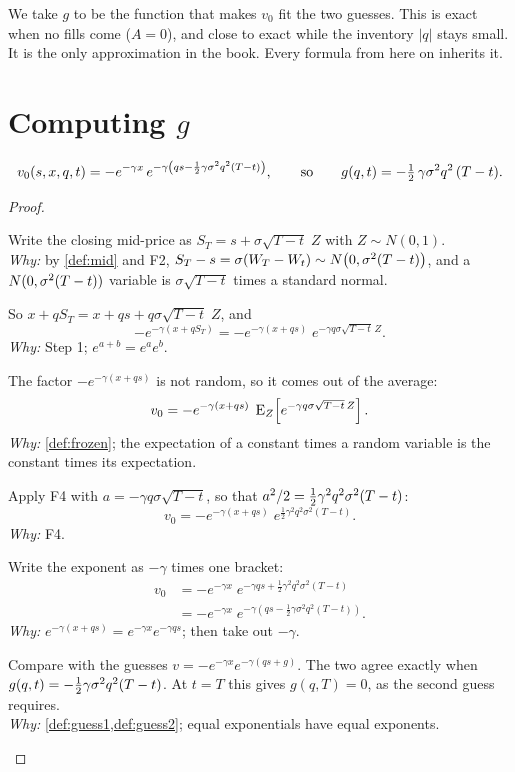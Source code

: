 \begin{remark}[Approximation]
We take $g$ to be the function that makes $v_0$ fit the two guesses. This is exact when no fills come ($A=0$), and close to exact while the inventory $|q|$ stays small. It is the only approximation in the book. Every formula from here on inherits it.
\end{remark}

\section{Computing \texorpdfstring{$g$}{g}}

\begin{result}
\label{res:g}
\[
  v_0(s,x,q,t)=-e^{-\gamma x}\,e^{-\gamma\left(qs-\frac12\gamma\sigma^2q^2(T-t)\right)},
  \qquad\text{so}\qquad
  g(q,t)=-\tfrac12\,\gamma\sigma^2q^2\,(T-t) .
\]
\end{result}

\begin{proof}
\begin{steps}
  \item Write the closing mid-price as $S_T=s+\sigma\sqrt{T-t}\;Z$ with $Z\sim N(0,1)$.
  \\ \emph{Why:} by \cref{def:mid} and F2, $S_T-s=\sigma(W_T-W_t)\sim N\big(0,\sigma^2(T-t)\big)$, and a $N(0,\sigma^2(T-t))$ variable is $\sigma\sqrt{T-t}$ times a standard normal.
  \item So $x+qS_T=x+qs+q\sigma\sqrt{T-t}\;Z$, and
  \[
    -e^{-\gamma(x+qS_T)}=-e^{-\gamma(x+qs)}\;e^{-\gamma q\sigma\sqrt{T-t}\,Z}.
  \]
  \emph{Why:} Step 1; $e^{a+b}=e^ae^b$.
  \item The factor $-e^{-\gamma(x+qs)}$ is not random, so it comes out of the average:
  \[
    v_0=-e^{-\gamma(x+qs)}\;\operatorname{E}_Z\!\left[e^{-\gamma q\sigma\sqrt{T-t}\,Z}\right].
  \]
  \emph{Why:} \cref{def:frozen}; the expectation of a constant times a random variable is the constant times its expectation.
  \item Apply F4 with $a=-\gamma q\sigma\sqrt{T-t}$, so that $a^2/2=\tfrac12\gamma^2q^2\sigma^2(T-t)$:
  \[
    v_0=-e^{-\gamma(x+qs)}\;e^{\frac12\gamma^2q^2\sigma^2(T-t)}.
  \]
  \emph{Why:} F4.
  \item Write the exponent as $-\gamma$ times one bracket:
  \[
    \begin{aligned}
      v_0&=-e^{-\gamma x}\;e^{-\gamma qs+\frac12\gamma^2q^2\sigma^2(T-t)}\\
      &=-e^{-\gamma x}\;e^{-\gamma\left(qs-\frac12\gamma\sigma^2q^2(T-t)\right)}.
    \end{aligned}
  \]
  \emph{Why:} $e^{-\gamma(x+qs)}=e^{-\gamma x}e^{-\gamma qs}$; then take out $-\gamma$.
  \item Compare with the guesses $v=-e^{-\gamma x}e^{-\gamma(qs+g)}$. The two agree exactly when $g(q,t)=-\tfrac12\gamma\sigma^2q^2(T-t)$. At $t=T$ this gives $g(q,T)=0$, as the second guess requires.
  \\ \emph{Why:} \cref{def:guess1,def:guess2}; equal exponentials have equal exponents.
\end{steps}
\end{proof}

